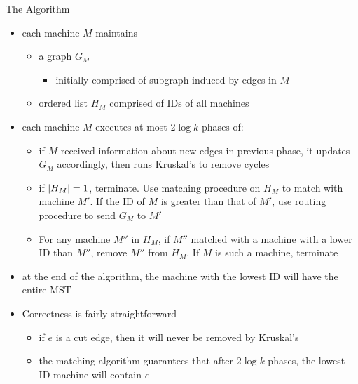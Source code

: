 \begin{frame}{The Algorithm}
    \begin{itemize}
        \item each machine $M$ maintains
              \begin{itemize}
                  \item a graph $G_M$
                        \begin{itemize}
                            \item initially comprised of subgraph induced by edges in $M$
                        \end{itemize}
                  \item ordered list $H_M$ comprised of IDs of all machines
              \end{itemize}
        \item each machine $M$ executes at most $2\log{k}$ phases of:
              \begin{itemize}
                  \item if $M$ received information about new edges in previous phase,
                        it updates $G_M$ accordingly, then runs Kruskal's to remove cycles
                  \item if $\left\lvert H_M\right\rvert = 1$, terminate. Use matching procedure on $H_M$ to
                        match with machine $M'$. If the ID of $M$ is greater than that of $M'$,
                        use routing procedure to send $G_M$ to $M'$
                  \item For any machine $M''$ in $H_M$, if $M''$ matched with a machine with
                        a lower ID than $M''$, remove $M''$ from $H_M$. If $M$ is such a machine,
                        terminate
              \end{itemize}
        \item at the end of the algorithm, the machine with the lowest ID will have
              the entire MST
    \end{itemize}
\end{frame}

\begin{frame}
    \begin{itemize}
        \item Correctness is fairly straightforward
        \begin{itemize}
            \item if $e$ is a cut edge, then it will never be removed by Kruskal's
            \item the matching algorithm guarantees that after $2\log{k}$ phases, the lowest
            ID machine will contain $e$
        \end{itemize}
    \end{itemize}
\end{frame}